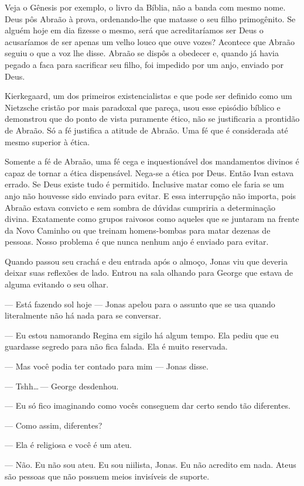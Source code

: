  Veja o Gênesis por exemplo, o livro da Bíblia, não a banda com mesmo nome. Deus pôs Abraão à prova, ordenando-lhe que matasse o seu filho primogênito. Se alguém hoje em dia fizesse o mesmo, será que acreditaríamos ser Deus o acusaríamos de ser apenas um velho louco que ouve vozes? Acontece que Abraão seguiu o que a voz lhe disse. Abraão se dispôs a obedecer e, quando já havia pegado a faca para sacrificar seu filho, foi impedido por um anjo, enviado por Deus.

Kierkegaard, um dos primeiros existencialistas e que pode ser definido como um Nietzsche cristão\mudanca{,} por mais paradoxal que pareça, usou esse episódio bíblico e demonstrou que do ponto de vista puramente ético, não se justificaria a prontidão de Abraão. Só a fé justifica a atitude de Abraão. Uma fé que é considerada até mesmo superior à ética.

Somente a fé de Abraão, uma fé cega e inquestionável dos mandamentos divinos é capaz de tornar a ética dispensável. Nega-se a ética por Deus. Então Ivan estava errado. Se Deus existe tudo é permitido. Inclusive matar como ele faria se um anjo não houvesse sido enviado para evitar. E essa interrupção não importa, pois Abraão estava convicto e sem sombra de dúvidas cumpriria a determinação divina. Exatamente como grupos raivosos como aqueles que se juntaram na frente da Novo Caminho ou que treinam homens-bombas para matar dezenas de pessoas. Nosso problema é que nunca nenhum anjo é enviado para evitar.

Quando passou seu crachá e deu entrada após o almoço, Jonas viu que deveria deixar suas reflexões de lado. Entrou na sala olhando para George que estava de alguma evitando o seu olhar.

--- Está fazendo sol hoje --- Jonas apelou para o assunto que se usa quando literalmente não há nada para se conversar.

--- Eu estou namorando Regina em sigilo há algum tempo. Ela pediu que eu guardasse segredo para não fica falada. Ela é muito reservada.

--- Mas você podia ter contado para mim --- Jonas disse.

--- Tshh\ldots\,--- George desdenhou.

--- Eu só fico imaginando como vocês conseguem dar certo sendo tão diferentes.

--- Como assim, diferentes?

--- Ela é religiosa e você é um ateu.

--- Não. Eu não sou ateu. Eu sou niilista, Jonas. Eu não acredito em nada. Ateus são pessoas que não possuem meios invisíveis de suporte.

